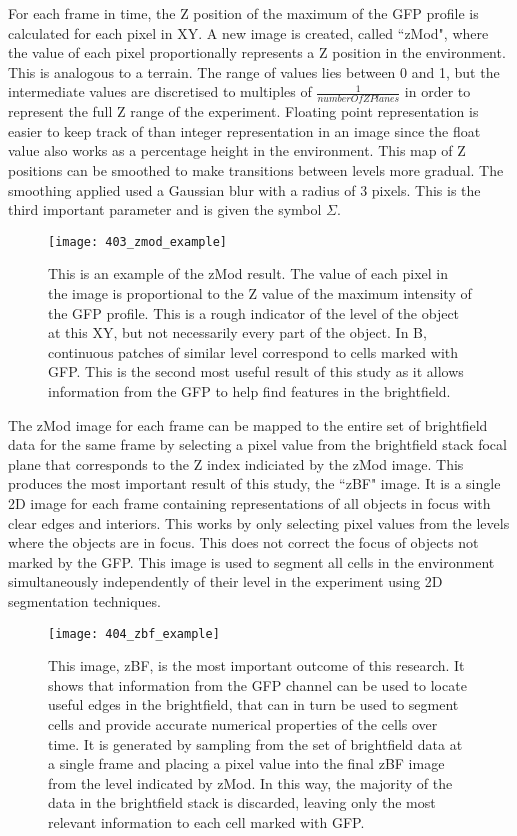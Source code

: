 For each frame in time, the Z position of the maximum of the GFP profile is calculated for each pixel in XY. A new image is created, called ``zMod", where the value of each pixel proportionally represents a Z position in the environment. This is analogous to a terrain. The range of values lies between 0 and 1, but the intermediate values are discretised to multiples of $\frac{1}{numberOfZPlanes}$ in order to represent the full Z range of the experiment. Floating point representation is easier to keep track of than integer representation in an image since the float value also works as a percentage height in the environment. This map of Z positions can be smoothed to make transitions between levels more gradual. The smoothing applied used a Gaussian blur with a radius of 3 pixels. This is the third important parameter and is given the symbol $\Sigma$.

\begin{figure}[p]
 \centering
 \texttt{[image: 403\_zmod\_example]}
 \caption[zMod example]{
 	This is an example of the zMod result. The value of each pixel in the image is proportional to the Z value of the maximum intensity of the GFP profile. This is a rough indicator of the level of the object at this XY, but not necessarily every part of the object. In B, continuous patches of similar level correspond to cells marked with GFP. This is the second most useful result of this study as it allows information from the GFP to help find features in the brightfield.
 }
 \label{fig:zmodexample}
\end{figure}

The zMod image for each frame can be mapped to the entire set of brightfield data for the same frame by selecting a pixel value from the brightfield stack focal plane that corresponds to the Z index indiciated by the zMod image. This produces the most important result of this study, the ``zBF" image. It is a single 2D image for each frame containing representations of all objects in focus with clear edges and interiors. This works by only selecting pixel values from the levels where the objects are in focus. This does not correct the focus of objects not marked by the GFP. This image is used to segment all cells in the environment simultaneously independently of their level in the experiment using 2D segmentation techniques.

\begin{figure}[p]
 \centering
 \texttt{[image: 404\_zbf\_example]}
 \caption[zBF example]{
 	This image, zBF, is the most important outcome of this research. It shows that information from the GFP channel can be used to locate useful edges in the brightfield, that can in turn be used to segment cells and provide accurate numerical properties of the cells over time. It is generated by sampling from the set of brightfield data at a single frame and placing a pixel value into the final zBF image from the level indicated by zMod. In this way, the majority of the data in the brightfield stack is discarded, leaving only the most relevant information to each cell marked with GFP.
 }
 \label{fig:zbf}
\end{figure}

